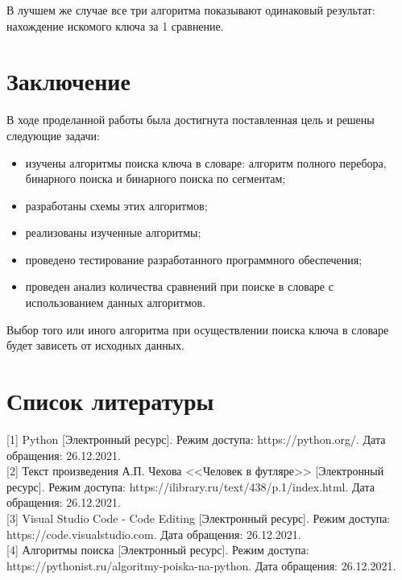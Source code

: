\documentclass[12pt, a4paper]{report}
\begin{document}
	В лучшем же случае все три алгоритма показывают одинаковый результат: нахождение искомого ключа за 1 сравнение.
	
	
	\chapter*{Заключение}
	
	В ходе проделанной работы была достигнута поставленная цель и решены следующие задачи:
	
	\begin{itemize}
		\item изучены алгоритмы поиска ключа в словаре: алгоритм полного перебора, бинарного поиска и бинарного поиска по сегментам;
		\item разработаны схемы этих алгоритмов;
		\item реализованы изученные алгоритмы;
		\item проведено тестирование разработанного программного обеспечения;
		\item проведен анализ количества сравнений при поиске в словаре с использованием данных алгоритмов.
	\end{itemize}
	
	Выбор того или иного алгоритма при осуществлении поиска ключа в словаре будет зависеть от исходных данных.
	
	\chapter*{Список литературы}
	
	[1] Python [Электронный ресурс]. Режим доступа: https://python.org/. Дата обращения: 26.12.2021.\\
	
	[2] Текст произведения А.П. Чехова <<Человек в футляре>> [Электронный ресурс]. Режим доступа: https://ilibrary.ru/text/438/p.1/index.html. Дата обращения: 26.12.2021.\\
	
	[3] Visual Studio Code - Code Editing [Электронный ресурс]. Режим доступа: https://code.visualstudio.com. Дата обращения: 26.12.2021.\\
	
	[4] Алгоритмы поиска [Электронный ресурс]. Режим доступа: \newline https://pythonist.ru/algoritmy-poiska-na-python. Дата обращения: 26.12.2021.
	
\end{document}
